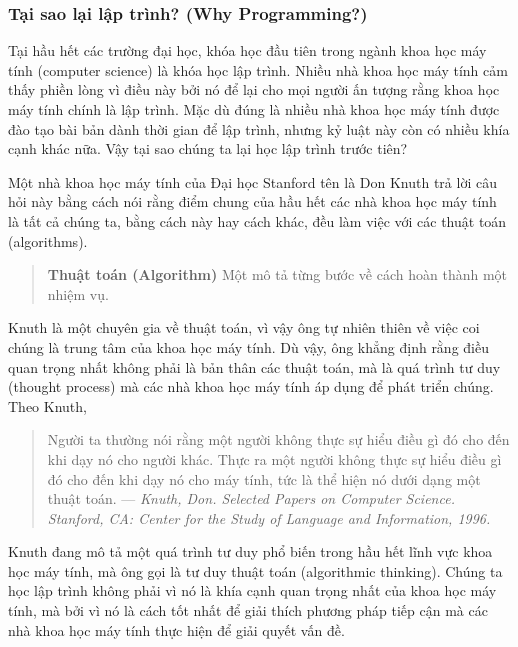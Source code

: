 \subsubsection{Tại sao lại lập trình? (Why
Programming?)}\label{tux1ea1i-sao-lux1ea1i-lux1eadp-truxecnh-why-programming}

Tại hầu hết các trường đại học, khóa học đầu tiên trong ngành khoa học
máy tính (computer science) là khóa học lập trình. Nhiều nhà khoa học
máy tính cảm thấy phiền lòng vì điều này bởi nó để lại cho mọi người ấn
tượng rằng khoa học máy tính chính là lập trình. Mặc dù đúng là nhiều
nhà khoa học máy tính được đào tạo bài bản dành thời gian để lập trình,
nhưng kỷ luật này còn có nhiều khía cạnh khác nữa. Vậy tại sao chúng ta
lại học lập trình trước tiên?

Một nhà khoa học máy tính của Đại học Stanford tên là Don Knuth trả lời
câu hỏi này bằng cách nói rằng điểm chung của hầu hết các nhà khoa học
máy tính là tất cả chúng ta, bằng cách này hay cách khác, đều làm việc
với các thuật toán (algorithms).

\begin{quote}
\textbf{Thuật toán (Algorithm)} Một mô tả từng bước về cách hoàn thành
một nhiệm vụ.
\end{quote}

Knuth là một chuyên gia về thuật toán, vì vậy ông tự nhiên thiên về việc
coi chúng là trung tâm của khoa học máy tính. Dù vậy, ông khẳng định
rằng điều quan trọng nhất không phải là bản thân các thuật toán, mà là
quá trình tư duy (thought process) mà các nhà khoa học máy tính áp dụng
để phát triển chúng. Theo Knuth,

\begin{quote}
Người ta thường nói rằng một người không thực sự hiểu điều gì đó cho đến
khi dạy nó cho người khác. Thực ra một người không thực sự hiểu điều gì
đó cho đến khi dạy nó cho máy tính, tức là thể hiện nó dưới dạng một
thuật toán. --- \emph{Knuth, Don. Selected Papers on Computer Science.
Stanford, CA: Center for the Study of Language and Information, 1996.}
\end{quote}

Knuth đang mô tả một quá trình tư duy phổ biến trong hầu hết lĩnh vực
khoa học máy tính, mà ông gọi là tư duy thuật toán (algorithmic
thinking). Chúng ta học lập trình không phải vì nó là khía cạnh quan
trọng nhất của khoa học máy tính, mà bởi vì nó là cách tốt nhất để giải
thích phương pháp tiếp cận mà các nhà khoa học máy tính thực hiện để
giải quyết vấn đề.

